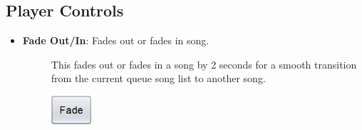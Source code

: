\documentclass{article}
\begin{document}
\subsection{Player Controls}

\begin{itemize}
    \item \textbf{Fade Out/In}: Fades out or fades in song.
    \begin{description}
        \item[] This fades out or fades in a song by 2 seconds for a smooth transition from the current queue song list to another song.
        \item[] \includegraphics[width=1.5cm]{Images/Fade.png}
    \end{description}
    
    \clearpage
    

\end{itemize}
\end{document}
